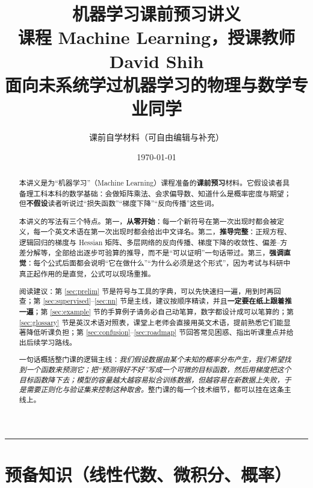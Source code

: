 \documentclass[UTF8,a4paper,11pt]{ctexart}
\title{\textbf{机器学习课前预习讲义}\\[6pt]
\large 课程 Machine Learning，授课教师 David Shih\\[4pt]
\large 面向未系统学过机器学习的物理与数学专业同学}
\author{课前自学材料（可自由编辑与补充）}
\date{\today}
\theoremstyle{definition}
\theoremstyle{plain}
\theoremstyle{remark}
\begin{document}
\maketitle

\begin{abstract}
\noindent
本讲义是为“机器学习”（Machine Learning）课程准备的\textbf{课前预习}材料。它假设读者具备理工科本科的数学基础：会做矩阵乘法、会求偏导数、知道什么是概率密度与期望；但\textbf{不假设}读者听说过“损失函数”“梯度下降”“反向传播”这些词。

本讲义的写法有三个特点。第一，\textbf{从零开始}：每一个新符号在第一次出现时都会被定义，每一个英文术语在第一次出现时都会给出中文译名。第二，\textbf{推导完整}：正规方程、逻辑回归的梯度与 Hessian 矩阵、多层网络的反向传播、梯度下降的收敛性、偏差--方差分解等，全部给出逐步可验算的推导，而不是“可以证明”一句话带过。第三，\textbf{强调直觉}：每个公式后面都会说明“它在做什么”“为什么必须是这个形式”，因为考试与科研中真正起作用的是直觉，公式可以现场重推。

阅读建议：第 \ref{sec:prelim} 节是符号与工具的字典，可以先快速扫一遍，用到时再回查；第 \ref{sec:supervised}--\ref{sec:nn} 节是主线，建议按顺序精读，并且\textbf{一定要在纸上跟着推一遍}；第 \ref{sec:example} 节的手算例子请务必自己动笔算，数字都设计成可以笔算的；第 \ref{sec:glossary} 节是英汉术语对照表，课堂上老师会直接用英文术语，提前熟悉它们能显著降低听课负担；第 \ref{sec:confusion}--\ref{sec:roadmap} 节回答常见困惑、指出听课重点并给出后续学习路线。

一句话概括整门课的逻辑主线：\emph{我们假设数据由某个未知的概率分布产生，我们希望找到一个函数来预测它；把“预测得好不好”写成一个可微的目标函数，然后用梯度把这个目标函数降下去；模型的容量越大越容易拟合训练数据，但越容易在新数据上失败，于是需要正则化与验证集来控制这种取舍。}整门课的每一个技术细节，都可以挂在这条主线上。
\end{abstract}

\vspace{1em}
\begin{center}
\rule{0.85\textwidth}{0.4pt}
\end{center}
\vspace{0.5em}

\tableofcontents
\newpage

\section{预备知识（线性代数、微积分、概率）}\label{sec:prelim}
\end{document}
